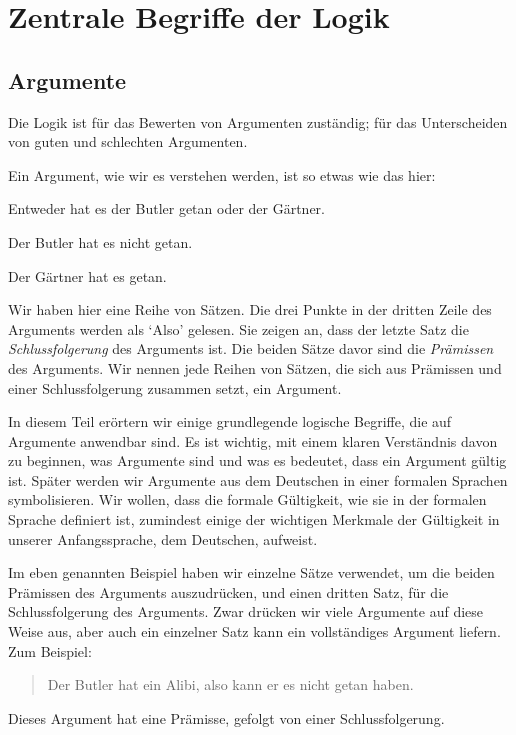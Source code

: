 
\part{Zentrale Begriffe der Logik}
\label{ch.intro}


\chapter{Argumente}
\label{s:Arguments}

Die Logik ist für das Bewerten von Argumenten zuständig; für das Unterscheiden von guten und schlechten Argumenten. 

Ein Argument, wie wir es verstehen werden, ist so etwas wie das hier:
	\begin{earg}\label{argButlerGardner}
		\item[] Entweder hat es der Butler getan oder der Gärtner.
		\item[] Der Butler hat es nicht getan.
		\item[\therefore] Der Gärtner hat es getan.
	\end{earg}
Wir haben hier eine Reihe von Sätzen. Die drei Punkte in der dritten Zeile des Arguments werden als `Also' gelesen. Sie zeigen an, dass der letzte Satz die \emph{Schlussfolgerung} des Arguments ist. Die beiden Sätze davor sind die \emph{Prämissen} des Arguments. Wir nennen jede Reihen von Sätzen, die sich aus Prämissen und einer Schlussfolgerung zusammen setzt, ein Argument.

In diesem Teil erörtern wir einige grundlegende logische Begriffe, die auf Argumente anwendbar sind. Es ist wichtig, mit einem klaren Verständnis davon zu beginnen, was Argumente sind und was es bedeutet, dass ein Argument gültig ist. Später werden wir Argumente aus dem Deutschen in einer formalen Sprachen symbolisieren. Wir wollen, dass die formale Gültigkeit, wie sie in der formalen Sprache definiert ist, zumindest einige der wichtigen Merkmale der Gültigkeit in unserer Anfangssprache, dem Deutschen, aufweist.

Im eben genannten Beispiel haben wir einzelne Sätze verwendet, um die beiden Prämissen des Arguments auszudrücken, und einen dritten Satz, für die Schlussfolgerung des Arguments. Zwar drücken wir viele Argumente auf diese Weise aus, aber auch ein einzelner Satz kann ein vollständiges Argument liefern. Zum Beispiel:
	\begin{quote}
		 Der Butler hat ein Alibi, also kann er es nicht getan haben. 
	\end{quote}
Dieses Argument hat eine Prämisse, gefolgt von einer Schlussfolgerung.

